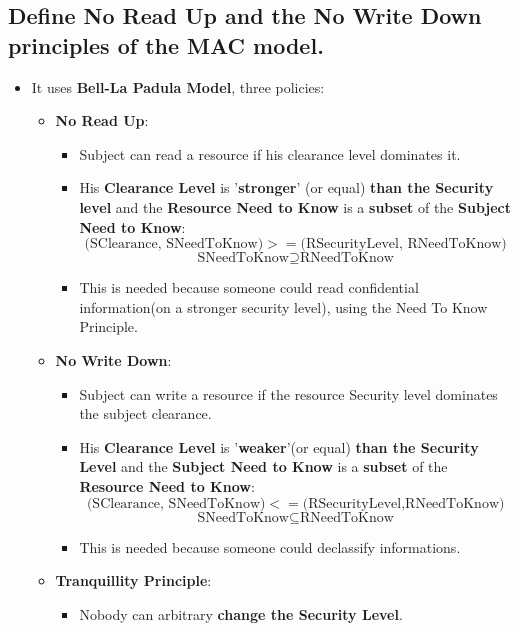 \documentclass[9pt, letterpaper]{article}
\begin{document}
\subsection{Define No Read Up and the No Write Down principles of the MAC model.}
\begin{itemize}
\item It uses \textbf{Bell-La Padula Model}, three policies:
	\begin{itemize}
		\item \textbf{No Read Up}: 
		\begin{itemize}
			\item Subject can read a resource if his clearance level dominates it.
			\item His \textbf{Clearance Level} is '\textbf{stronger}' (or equal) \textbf{than the Security level} and the \textbf{Resource Need to Know} is a \textbf{subset} of the \textbf{Subject Need to Know}:
			$$(\mbox{SClearance, SNeedToKnow)}>=(\mbox{RSecurityLevel, RNeedToKnow)}$$ 
			$$\mbox{SNeedToKnow} \supseteq \mbox{RNeedToKnow}$$
			\item This is needed because someone could read confidential information(on a stronger security level), using the Need To Know Principle.
		\end{itemize}			 
		\item \textbf{No Write Down}: 
		\begin{itemize}
			\item Subject can write a resource if the resource Security level dominates the subject clearance.
			\item His \textbf{Clearance Level} is '\textbf{weaker}'(or equal) \textbf{than the Security Level} and the \textbf{Subject Need to Know} is a \textbf{subset} of the \textbf{Resource Need to Know}:
			$$(\mbox{SClearance, SNeedToKnow)} <= (\mbox{RSecurityLevel,RNeedToKnow)}$$
			$$\mbox{SNeedToKnow} \subseteq \mbox{RNeedToKnow}$$
			\item This is needed because someone could declassify informations.
		\end{itemize}			 
		\item \textbf{Tranquillity Principle}: 
		\begin{itemize}
			\item Nobody can arbitrary \textbf{change the Security Level}.
		\end{itemize}
	\end{itemize}
\end{itemize}
\end{document}
